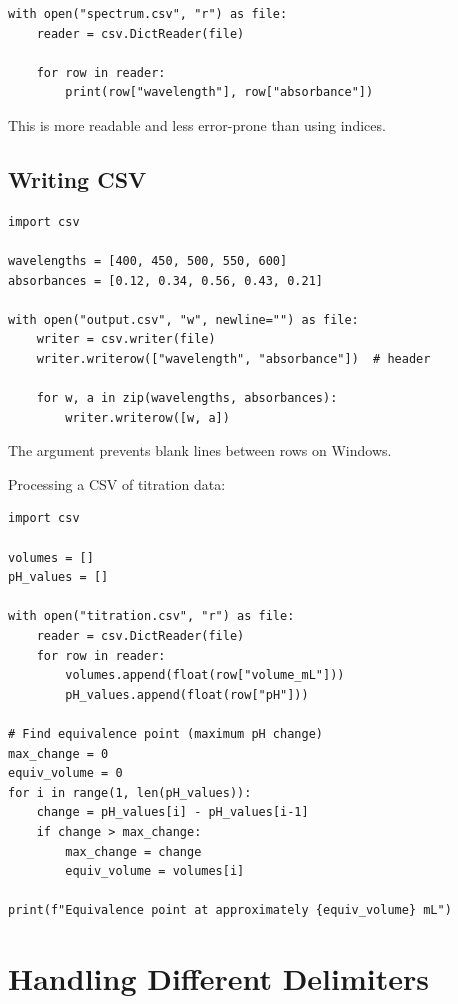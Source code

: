 \begin{labexample}
\begin{lstlisting}
with open("spectrum.csv", "r") as file:
    reader = csv.DictReader(file)

    for row in reader:
        print(row["wavelength"], row["absorbance"])
\end{lstlisting}

This is more readable and less error-prone than using indices.

\subsection{Writing CSV}

\begin{lstlisting}
import csv

wavelengths = [400, 450, 500, 550, 600]
absorbances = [0.12, 0.34, 0.56, 0.43, 0.21]

with open("output.csv", "w", newline="") as file:
    writer = csv.writer(file)
    writer.writerow(["wavelength", "absorbance"])  # header

    for w, a in zip(wavelengths, absorbances):
        writer.writerow([w, a])
\end{lstlisting}

\begin{note}
The  argument prevents blank lines between rows on Windows.
\end{note}

\begin{labexample}
Processing a CSV of titration data:

\begin{lstlisting}
import csv

volumes = []
pH_values = []

with open("titration.csv", "r") as file:
    reader = csv.DictReader(file)
    for row in reader:
        volumes.append(float(row["volume_mL"]))
        pH_values.append(float(row["pH"]))

# Find equivalence point (maximum pH change)
max_change = 0
equiv_volume = 0
for i in range(1, len(pH_values)):
    change = pH_values[i] - pH_values[i-1]
    if change > max_change:
        max_change = change
        equiv_volume = volumes[i]

print(f"Equivalence point at approximately {equiv_volume} mL")
\end{lstlisting}
\end{labexample}

\section{Handling Different Delimiters}
\label{sec:delimiters}


\end{labexample}

